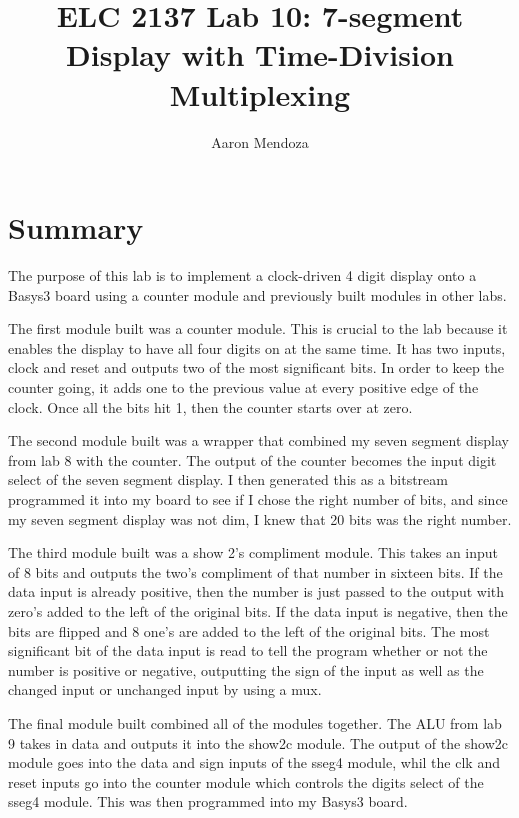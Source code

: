 \documentclass[11pt]{article}
\begin{document}
\title{ELC 2137 Lab 10: 7-segment Display with Time-Division Multiplexing}
\author{Aaron Mendoza}

\maketitle


\section*{Summary}

The purpose of this lab is to implement a clock-driven 4 digit display onto a Basys3 board using a counter module and previously built modules in other labs.

The first module built was a counter module. This is crucial to the lab because it enables the display to have all four digits on at the same time. It has two inputs, clock and reset and outputs two of the most significant bits. In order to keep the counter going, it adds one to the previous value at every positive edge of the clock. Once all the bits hit 1, then the counter starts over at zero. 

The second module built was a wrapper that combined my seven segment display from lab 8 with the counter. The output of the counter becomes the input digit select of the seven segment display. I then generated this as a bitstream programmed it into my board to see if I chose the right number of bits, and since my seven segment display was not dim, I knew that 20 bits was the right number.

The third module built was a show 2's compliment module. This takes an input of 8 bits and outputs the two's compliment of that number in sixteen bits. If the data input is already positive, then the number is just passed to the output with zero's added to the left of the original bits. If the data input is negative, then the bits are flipped and 8 one's are added to the left of the original bits. The most significant bit of the data input is read to tell the program whether or not the number is positive or negative, outputting the sign of the input as well as the changed input or unchanged input by using a mux.

The final module built combined all of the modules together. The ALU from lab 9 takes in data and outputs it into the show2c module. The output of the show2c module goes into the data and sign inputs of the sseg4 module, whil the clk and reset inputs go into the counter module which controls the digits select of the sseg4 module. This was then programmed into my Basys3 board.
\end{document}
